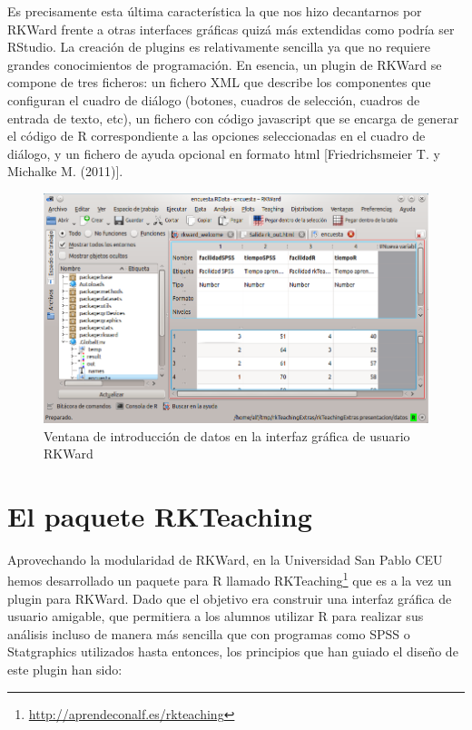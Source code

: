 \documentclass[10pt,twoside,spanish]{article}
\numberwithin{equation}{section}
\begin{document}
Es precisamente esta última característica la que nos hizo decantarnos por RKWard frente a otras interfaces gráficas quizá más extendidas
como podría ser RStudio. La creación de plugins es relativamente sencilla ya que no requiere grandes conocimientos de programación. En
esencia, un plugin de RKWard se compone de tres ficheros:
un fichero XML que describe los componentes que configuran el cuadro de diálogo (botones, cuadros de selección, cuadros de entrada de texto,
etc), un fichero con código javascript que se encarga de generar el código de R correspondiente a las opciones seleccionadas en el cuadro de
diálogo, y un fichero de ayuda opcional en formato html [Friedrichsmeier T. y Michalke M. (2011)].

\begin{figure}[htp]
\begin{center}
  \includegraphics[scale=0.5]{img/rkward_entrada_datos.png}
  \caption{Ventana de introducción de datos en la interfaz gráfica de usuario RKWard}
  \label{g:RKWard_entrada_datos}
\end{center}
\end{figure}

\section{El paquete RKTeaching}
Aprovechando la modularidad de RKWard, en la Universidad San Pablo CEU hemos desarrollado un paquete para R llamado
RKTeaching\footnote{\url{http://aprendeconalf.es/rkteaching}} que es a la vez un plugin para RKWard.
Dado que el objetivo era construir una interfaz gráfica de usuario amigable, que permitiera a los alumnos utilizar R para realizar sus
análisis incluso de manera más sencilla que con programas como SPSS o Statgraphics utilizados hasta entonces, los principios que han guiado
el diseño de este plugin han sido:
\end{document}
